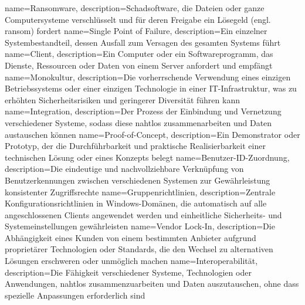 {
	name={Rans\-om\-ware},
	description={Schad\-soft\-ware, die Da\-tei\-en oder gan\-ze Com\-pu\-ter\-sys\-te\-me ver\-schlüs\-selt und für de\-ren Frei\-ga\-be ein Lö\-se\-geld (engl. ran\-som) for\-dert}
}
{
	name={Sin\-gle Point of Fai\-lure},
	description={Ein ein\-zel\-ner Sys\-tem\-be\-stand\-teil, des\-sen Aus\-fall zum Ver\-sa\-gen des ge\-sam\-ten Sys\-tems führt}
}
{
	name={Cli\-ent},
	description={Ein Com\-pu\-ter oder ein Soft\-ware\-pro\-gramm, das Diens\-te, Res\-sour\-cen oder Da\-ten von ei\-nem Ser\-ver an\-for\-dert und emp\-fängt}
}
{
	name={Mo\-no\-kul\-tur},
	description={Die vor\-herr\-schen\-de Ver\-wen\-dung ei\-nes ein\-zi\-gen Be\-triebs\-sys\-tems oder ei\-ner ein\-zi\-gen Tech\-no\-lo\-gie in ei\-ner IT-In\-fra\-struk\-tur, was zu er\-höh\-ten Si\-cher\-heits\-ri\-si\-ken und ge\-rin\-ge\-rer Di\-ver\-si\-tät füh\-ren kann}
}
{
	name={In\-te\-gra\-ti\-on},
	description={Der Pro\-zess der Ein\-bin\-dung und Ver\-net\-zung ver\-schie\-de\-ner Sys\-te\-me, so\-dass die\-se naht\-los zu\-sam\-men\-ar\-bei\-ten und Da\-ten aus\-tau\-schen kön\-nen}
}
{
	name={Proof-of-Con\-cept},
	description={Ein De\-mons\-tra\-tor oder Pro\-to\-typ, der die Durch\-führ\-bar\-keit und prak\-ti\-sche Re\-a\-li\-sier\-bar\-keit ei\-ner tech\-ni\-schen Lö\-sung oder ei\-nes Kon\-zepts be\-legt}
}
{
	name={Be\-nut\-zer-ID-Zu\-ord\-nung},
	description={Die ein\-deu\-ti\-ge und nach\-voll\-zieh\-ba\-re Ver\-knüp\-fung von Be\-nut\-zer\-ken\-nun\-gen zwi\-schen ver\-schie\-de\-nen Sys\-te\-men zur Ge\-währ\-leis\-tung kon\-sis\-ten\-ter Zu\-griffs\-rech\-te}
}
{
	name={Grup\-pen\-richt\-li\-ni\-en},
	description={Zen\-tra\-le Kon\-fi\-gu\-ra\-ti\-ons\-richt\-li\-ni\-en in Win\-dows-Do\-mä\-nen, die au\-to\-ma\-tisch auf alle an\-ge\-schlos\-se\-nen Cli\-ents an\-ge\-wen\-det wer\-den und ein\-heit\-li\-che Si\-cher\-heits- und Sys\-tem\-ein\-stel\-lun\-gen ge\-währ\-leis\-ten}
}
{
	name={Ven\-dor Lock-In},
	description={Die Ab\-hän\-gig\-keit ei\-nes Kun\-den von ei\-nem be\-stimm\-ten An\-bie\-ter auf\-grund pro\-prie\-tä\-rer Tech\-no\-lo\-gi\-en oder Stan\-dards, die den Wech\-sel zu al\-ter\-na\-ti\-ven Lö\-sun\-gen er\-schwe\-ren oder un\-mög\-lich ma\-chen}
}
{
	name={In\-ter\-ope\-ra\-bi\-li\-tät},
	description={Die Fä\-hig\-keit ver\-schie\-de\-ner Sys\-te\-me, Tech\-no\-lo\-gi\-en oder An\-wen\-dun\-gen, naht\-los zu\-sam\-men\-zu\-ar\-bei\-ten und Da\-ten aus\-zu\-tau\-schen, ohne dass spe\-zi\-el\-le An\-pas\-sun\-gen er\-for\-der\-lich sind}
}
